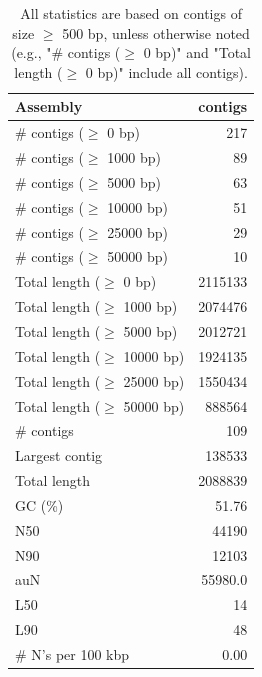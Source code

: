 \documentclass[12pt,a4paper]{article}
\begin{document}
\begin{table}[ht]
\begin{center}
\caption{All statistics are based on contigs of size $\geq$ 500 bp, unless otherwise noted (e.g., "\# contigs ($\geq$ 0 bp)" and "Total length ($\geq$ 0 bp)" include all contigs).}
\begin{tabular}{|l*{1}{|r}|}
\hline
Assembly & contigs \\ \hline
\# contigs ($\geq$ 0 bp) & 217 \\ \hline
\# contigs ($\geq$ 1000 bp) & 89 \\ \hline
\# contigs ($\geq$ 5000 bp) & 63 \\ \hline
\# contigs ($\geq$ 10000 bp) & 51 \\ \hline
\# contigs ($\geq$ 25000 bp) & 29 \\ \hline
\# contigs ($\geq$ 50000 bp) & 10 \\ \hline
Total length ($\geq$ 0 bp) & 2115133 \\ \hline
Total length ($\geq$ 1000 bp) & 2074476 \\ \hline
Total length ($\geq$ 5000 bp) & 2012721 \\ \hline
Total length ($\geq$ 10000 bp) & 1924135 \\ \hline
Total length ($\geq$ 25000 bp) & 1550434 \\ \hline
Total length ($\geq$ 50000 bp) & 888564 \\ \hline
\# contigs & 109 \\ \hline
Largest contig & 138533 \\ \hline
Total length & 2088839 \\ \hline
GC (\%) & 51.76 \\ \hline
N50 & 44190 \\ \hline
N90 & 12103 \\ \hline
auN & 55980.0 \\ \hline
L50 & 14 \\ \hline
L90 & 48 \\ \hline
\# N's per 100 kbp & 0.00 \\ \hline
\end{tabular}
\end{center}
\end{table}
\end{document}
